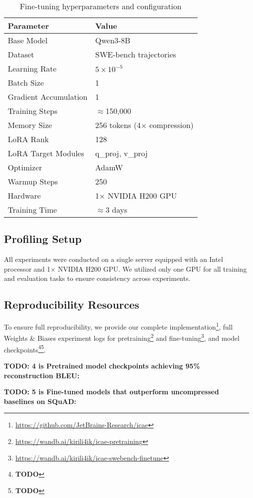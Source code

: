 \begin{table}[h]
    \centering
    \small
    \begin{tabular}{ll}
        \toprule
        \textbf{Parameter} & \textbf{Value} \\
        \midrule
        Base Model & Qwen3-8B \\
        Dataset & SWE-bench trajectories \\
        Learning Rate & $5 \times 10^{-5}$ \\
        Batch Size & 1 \\
        Gradient Accumulation & 1 \\
        Training Steps & $\approx$150,000 \\
        Memory Size & 256 tokens (4× compression) \\
        LoRA Rank & 128 \\
        LoRA Target Modules & q\_proj, v\_proj \\
        Optimizer & AdamW \\
        Warmup Steps & 250 \\
        Hardware & 1× NVIDIA H200 GPU \\
        Training Time & $\approx$3 days \\
        \bottomrule
    \end{tabular}
    \caption{Fine-tuning hyperparameters and configuration}
    \label{tab:finetune_config}
\end{table}

\subsection{Profiling Setup}

All experiments were conducted on a single server equipped with an Intel processor and 1× NVIDIA H200 GPU. We utilized only one GPU for all training and evaluation tasks to ensure consistency across experiments.

\subsection{Reproducibility Resources}
To ensure full reproducibility, we provide our complete implementation\footnote{\url{https://github.com/JetBrains-Research/icae}}, full Weights \& Biases experiment logs for pretraining\footnote{\url{https://wandb.ai/kirili4ik/icae-pretraining}} and fine-tuning\footnote{\url{https://wandb.ai/kirili4ik/icae-swebench-finetune}}, and model checkpoints\footnote{\textbf{TODO}}\footnote{\textbf{TODO}}.

\textbf{TODO: 4 is Pretrained model checkpoints achieving 95\% reconstruction BLEU:}

\textbf{TODO: 5 is Fine-tuned models that outperform uncompressed baselines on SQuAD:}